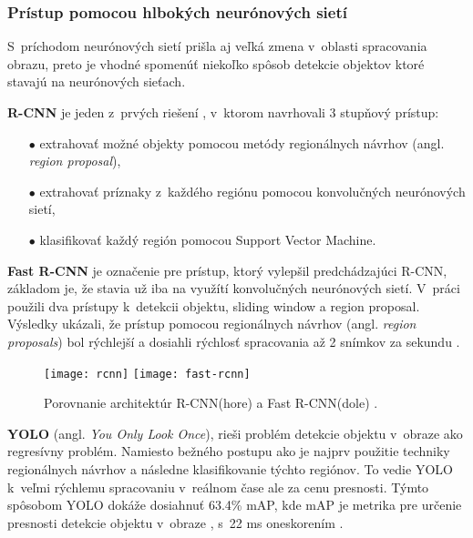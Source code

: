 \subsubsection{Prístup pomocou hlbokých neurónových sietí}
S~príchodom neurónových sietí prišla aj veľká zmena v~oblasti spracovania obrazu, preto je vhodné spomenúť niekoľko spôsob
    detekcie objektov ktoré stavajú na neurónových sieťach.

\textbf{R-CNN} je jeden z~prvých riešení \cite{prop:rcnn}, v~ktorom navrhovali 3 stupňový prístup:
\begin{enumerate}
	\item[$\bullet$] extrahovať možné objekty pomocou metódy regionálnych návrhov (angl. \textit{region proposal}),
    \item[$\bullet$] extrahovať príznaky z~každého regiónu pomocou konvolučných neurónových sietí,
    \item[$\bullet$] klasifikovať každý región pomocou Support Vector Machine.
\end{enumerate}

\textbf{Fast R-CNN} je označenie pre prístup, ktorý vylepšil predchádzajúci R-CNN, základom je, že stavia už iba na využítí konvolučných neurónových sietí.
V~práci použili dva prístupy k~detekcii objektu, sliding window a region proposal.
Výsledky ukázali, že prístup pomocou regionálnych návrhov (angl. \textit{region proposals}) bol rýchlejší a dosiahli rýchlosť spracovania až 2 snímkov za sekundu \cite{prop:fast-rcnn}.
\begin{figure}[H]
    \centering
    \texttt{[image: rcnn]}
    \qquad
    \texttt{[image: fast-rcnn]}
    \caption{Porovnanie architektúr R-CNN(hore) a Fast R-CNN(dole) \cite{odkaz:ObjectDetectionOverview}.}
    \label{pic:FastRCNN}
\end{figure}

\textbf{YOLO} (angl. \textit{You Only Look Once}), rieši problém detekcie objektu v~obraze ako regresívny problém.
Namiesto bežného postupu ako je najprv použitie techniky regionálnych návrhov a následne klasifikovanie týchto regiónov.
To vedie YOLO k~veľmi rýchlemu spracovaniu v~reálnom čase ale za cenu presnosti.
Týmto spôsobom YOLO dokáže dosiahnuť 63.4\% mAP, kde mAP je metrika pre určenie presnosti detekcie objektu v~obraze \cite{prop:metrics}, s~22 ms oneskorením \cite{prop:Redmon2016YouOL}.

